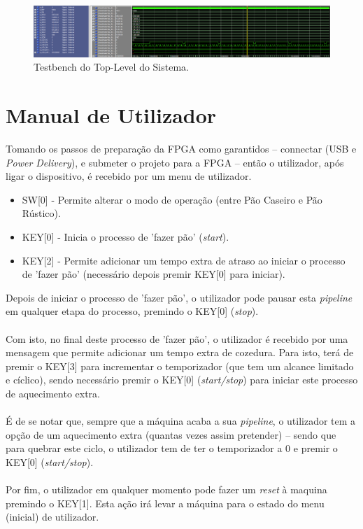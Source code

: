 \documentclass{report}
\begin{document}
\begin{figure}[h!] %
	\center
	\includegraphics[width=335pt]{images/TopLevelTB_2}
	\caption{Testbench do Top-Level do Sistema.}
	\label{fig:imagem9}
\end{figure}

\chapter{Manual de Utilizador}
\label{chap.manualUtilizador}
Tomando os passos de preparação da FPGA como garantidos -- connectar (USB e \textit{Power Delivery}), e submeter o projeto para a FPGA -- então o utilizador, após ligar o dispositivo, é recebido por um menu de utilizador.
\begin{itemize}
	\item SW[0] - Permite alterar o modo de operação (entre Pão Caseiro e Pão Rústico).
	\item KEY[0] - Inicia o processo de 'fazer pão' (\textit{start}).
	\item KEY[2] - Permite adicionar um tempo extra de atraso ao iniciar o processo de 'fazer pão' (necessário depois premir KEY[0] para iniciar).
\end{itemize}
Depois de iniciar o processo de 'fazer pão', o utilizador pode pausar esta \textit{pipeline} em qualquer etapa do processo, premindo o KEY[0] (\textit{stop}).
\\\\
Com isto, no final deste processo de 'fazer pão', o utilizador é recebido por uma mensagem que permite adicionar um tempo extra de cozedura. Para isto, terá de premir o KEY[3] para incrementar o temporizador (que tem um alcance limitado e cíclico), sendo necessário premir o KEY[0] (\textit{start/stop}) para iniciar este processo de aquecimento extra.
\\\\
É de se notar que, sempre que a máquina acaba a sua \textit{pipeline}, o utilizador tem a opção de um aquecimento extra (quantas vezes assim pretender) -- sendo que para quebrar este ciclo, o utilizador tem de ter o temporizador a 0 e premir o KEY[0] (\textit{start/stop}).
\\\\
Por fim, o utilizador em qualquer momento pode fazer um \textit{reset} à maquina premindo o KEY[1]. Esta ação irá levar a máquina para o estado do menu (inicial) de utilizador.
\end{document}

